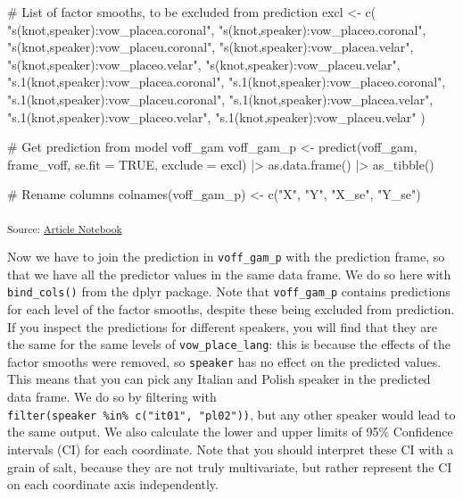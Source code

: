 \documentclass[
  man,
  longtable,
  nolmodern,
  notxfonts,
  notimes,
  colorlinks=true,linkcolor=blue,citecolor=blue,urlcolor=blue]{apa7}
\newenvironment{Shaded}{\begin{snugshade}}{\end{snugshade}}
\newcommand{\AttributeTok}[1]{\textcolor[rgb]{0.40,0.45,0.13}{#1}}
\newcommand{\CommentTok}[1]{\textcolor[rgb]{0.37,0.37,0.37}{#1}}
\newcommand{\ConstantTok}[1]{\textcolor[rgb]{0.56,0.35,0.01}{#1}}
\newcommand{\FunctionTok}[1]{\textcolor[rgb]{0.28,0.35,0.67}{#1}}
\newcommand{\NormalTok}[1]{\textcolor[rgb]{0.00,0.23,0.31}{#1}}
\newcommand{\OtherTok}[1]{\textcolor[rgb]{0.00,0.23,0.31}{#1}}
\newcommand{\SpecialCharTok}[1]{\textcolor[rgb]{0.37,0.37,0.37}{#1}}
\newcommand{\StringTok}[1]{\textcolor[rgb]{0.13,0.47,0.30}{#1}}
\begin{document}
\begin{Shaded}
\begin{Highlighting}[]
\CommentTok{\# List of factor smooths, to be excluded from prediction}
\NormalTok{excl }\OtherTok{\textless{}{-}} \FunctionTok{c}\NormalTok{(}
  \StringTok{"s(knot,speaker):vow\_placea.coronal"}\NormalTok{,}
  \StringTok{"s(knot,speaker):vow\_placeo.coronal"}\NormalTok{,}
  \StringTok{"s(knot,speaker):vow\_placeu.coronal"}\NormalTok{,}
  \StringTok{"s(knot,speaker):vow\_placea.velar"}\NormalTok{,}
  \StringTok{"s(knot,speaker):vow\_placeo.velar"}\NormalTok{,}
  \StringTok{"s(knot,speaker):vow\_placeu.velar"}\NormalTok{,}
  \StringTok{"s.1(knot,speaker):vow\_placea.coronal"}\NormalTok{,}
  \StringTok{"s.1(knot,speaker):vow\_placeo.coronal"}\NormalTok{,}
  \StringTok{"s.1(knot,speaker):vow\_placeu.coronal"}\NormalTok{,}
  \StringTok{"s.1(knot,speaker):vow\_placea.velar"}\NormalTok{,}
  \StringTok{"s.1(knot,speaker):vow\_placeo.velar"}\NormalTok{,}
  \StringTok{"s.1(knot,speaker):vow\_placeu.velar"}
\NormalTok{)}

\CommentTok{\# Get prediction from model voff\_gam}
\NormalTok{voff\_gam\_p }\OtherTok{\textless{}{-}} \FunctionTok{predict}\NormalTok{(voff\_gam, frame\_voff, }\AttributeTok{se.fit =} \ConstantTok{TRUE}\NormalTok{, }\AttributeTok{exclude =}\NormalTok{ excl) }\SpecialCharTok{|\textgreater{}}
  \FunctionTok{as.data.frame}\NormalTok{() }\SpecialCharTok{|\textgreater{}}
  \FunctionTok{as\_tibble}\NormalTok{()}

\CommentTok{\# Rename columns}
\FunctionTok{colnames}\NormalTok{(voff\_gam\_p) }\OtherTok{\textless{}{-}} \FunctionTok{c}\NormalTok{(}\StringTok{"X"}\NormalTok{, }\StringTok{"Y"}\NormalTok{, }\StringTok{"X\_se"}\NormalTok{, }\StringTok{"Y\_se"}\NormalTok{)}
\end{Highlighting}
\end{Shaded}

\textsubscript{Source:
\href{https://stefanocoretta.github.io/mv_uti/index.qmd.html}{Article
Notebook}}

Now we have to join the prediction in \texttt{voff\_gam\_p} with the
prediction frame, so that we have all the predictor values in the same
data frame. We do so here with \texttt{bind\_cols()} from the dplyr
package. Note that \texttt{voff\_gam\_p} contains predictions for each
level of the factor smooths, despite these being excluded from
prediction. If you inspect the predictions for different speakers, you
will find that they are the same for the same levels of
\texttt{vow\_place\_lang}: this is because the effects of the factor
smooths were removed, so \texttt{speaker} has no effect on the predicted
values. This means that you can pick any Italian and Polish speaker in
the predicted data frame. We do so by filtering with
\texttt{filter(speaker\ \%in\%\ c("it01",\ "pl02"))}, but any other
speaker would lead to the same output. We also calculate the lower and
upper limits of 95\% Confidence intervals (CI) for each coordinate. Note
that you should interpret these CI with a grain of salt, because they
are not truly multivariate, but rather represent the CI on each
coordinate axis independently.
\end{document}
